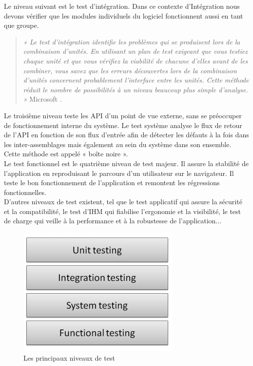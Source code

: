       Le niveau suivant est le test d'intégration. Dans ce contexte d’Intégration nous devons vérifier que les modules individuels du logiciel fonctionnent aussi en tant que groupe.\\

      \begin{quotation}
        \emph{« Le test d'intégration identifie les problèmes qui se produisent lors de la combinaison d'unités. En utilisant un plan de test exigeant que vous testiez chaque unité et que vous vérifiez la viabilité de chacune d'elles avant de les combiner, vous savez que les erreurs découvertes lors de la combinaison d'unités concernent probablement l'interface entre les unités. Cette méthode réduit le nombre de possibilités à un niveau beaucoup plus simple d'analyse. »} Microsoft \cite{Mic16}.\\
      \end{quotation}

      Le troisième niveau teste les API d’un point de vue externe, sans se préoccuper de fonctionnement interne du système. Le test système analyse le flux de retour de l’API en fonction de son flux d’entrée afin de détecter les défauts à la fois dans les inter-assemblages mais également au sein du système dans son ensemble. Cette méthode est appelé « boîte noire ».\\

       Le test fonctionnel est le quatrième niveau de test majeur. Il assure la stabilité de l’application en reproduisant le parcours d’un utilisateur sur le navigateur. Il teste le bon fonctionnement de l’application et remontent les régressions fonctionnelles.\\

       D’autres niveaux de test existent, tel que le test applicatif qui assure la sécurité et la compatibilité, le test d’IHM qui fiabilise l’ergonomie et la visibilité, le test de charge qui veille à la performance et à la robustesse de l’application...

       \begin{figure}
         \begin{center}
           \includegraphics[scale=0.7]{images/testingLevels.png}
         \end{center}
         \caption{Les principaux niveaux de test}
         \label{Testing levels}
       \end{figure}

